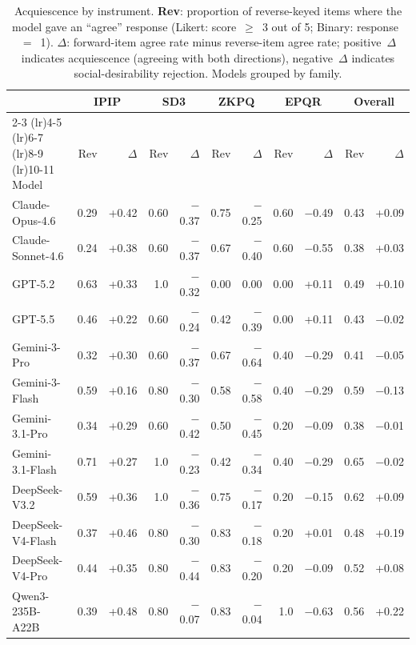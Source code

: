 \documentclass[11pt]{article}
\begin{document}
\begin{table}[t]
\centering
\small
\caption{Acquiescence by instrument. \textbf{Rev}: proportion of reverse-keyed items where the model gave an ``agree'' response (Likert: score~$\geq$~3 out of 5; Binary: response~$=$~1). \textbf{$\Delta$}: forward-item agree rate minus reverse-item agree rate; positive~$\Delta$ indicates acquiescence (agreeing with both directions), negative~$\Delta$ indicates social-desirability rejection. Models grouped by family.}
\label{tab:acq_full}
\begin{tabular}{l *{4}{rr} rr}
\toprule
& \multicolumn{2}{c}{IPIP} & \multicolumn{2}{c}{SD3} & \multicolumn{2}{c}{ZKPQ} & \multicolumn{2}{c}{EPQR} & \multicolumn{2}{c}{Overall} \\
\cmidrule(lr){2-3} \cmidrule(lr){4-5} \cmidrule(lr){6-7} \cmidrule(lr){8-9} \cmidrule(lr){10-11}
Model & Rev & $\Delta$ & Rev & $\Delta$ & Rev & $\Delta$ & Rev & $\Delta$ & Rev & $\Delta$ \\
\midrule
Claude-Opus-4.6 & 0.29 & +0.42 & 0.60 & $-$0.37 & 0.75 & $-$0.25 & 0.60 & $-$0.49 & 0.43 & +0.09 \\
Claude-Sonnet-4.6 & 0.24 & +0.38 & 0.60 & $-$0.37 & 0.67 & $-$0.40 & 0.60 & $-$0.55 & 0.38 & +0.03 \\
\midrule
GPT-5.2 & 0.63 & +0.33 & 1.0 & $-$0.32 & 0.00 & 0.00 & 0.00 & +0.11 & 0.49 & +0.10 \\
GPT-5.5 & 0.46 & +0.22 & 0.60 & $-$0.24 & 0.42 & $-$0.39 & 0.00 & +0.11 & 0.43 & $-$0.02 \\
\midrule
Gemini-3-Pro & 0.32 & +0.30 & 0.60 & $-$0.37 & 0.67 & $-$0.64 & 0.40 & $-$0.29 & 0.41 & $-$0.05 \\
Gemini-3-Flash & 0.59 & +0.16 & 0.80 & $-$0.30 & 0.58 & $-$0.58 & 0.40 & $-$0.29 & 0.59 & $-$0.13 \\
Gemini-3.1-Pro & 0.34 & +0.29 & 0.60 & $-$0.42 & 0.50 & $-$0.45 & 0.20 & $-$0.09 & 0.38 & $-$0.01 \\
Gemini-3.1-Flash & 0.71 & +0.27 & 1.0 & $-$0.23 & 0.42 & $-$0.34 & 0.40 & $-$0.29 & 0.65 & $-$0.02 \\
\midrule
DeepSeek-V3.2 & 0.59 & +0.36 & 1.0 & $-$0.36 & 0.75 & $-$0.17 & 0.20 & $-$0.15 & 0.62 & +0.09 \\
DeepSeek-V4-Flash & 0.37 & +0.46 & 0.80 & $-$0.30 & 0.83 & $-$0.18 & 0.20 & +0.01 & 0.48 & +0.19 \\
DeepSeek-V4-Pro & 0.44 & +0.35 & 0.80 & $-$0.44 & 0.83 & $-$0.20 & 0.20 & $-$0.09 & 0.52 & +0.08 \\
\midrule
Qwen3-235B-A22B & 0.39 & +0.48 & 0.80 & $-$0.07 & 0.83 & $-$0.04 & 1.0 & $-$0.63 & 0.56 & +0.22 \\

\end{tabular}
\end{table}
\end{document}
